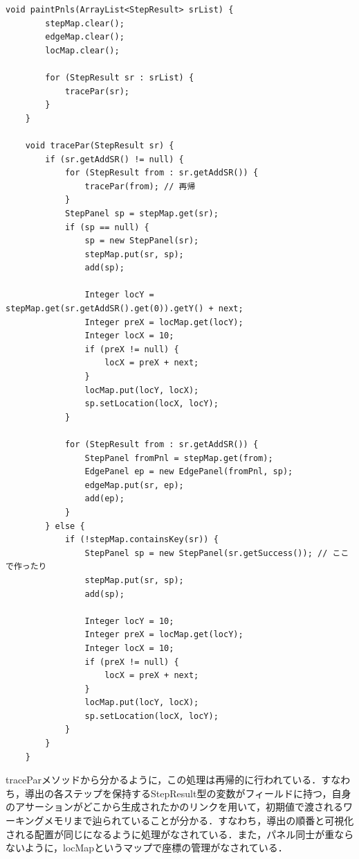 \documentclass[12pt]{jarticle}
\begin{document}
\begin{lstlisting}[caption=FwdChainGUIクラスのメソッドpaintPnls，tracePar, label=steplocation]
    void paintPnls(ArrayList<StepResult> srList) {
        stepMap.clear();
        edgeMap.clear();
        locMap.clear();

        for (StepResult sr : srList) {
            tracePar(sr);
        }
    }

    void tracePar(StepResult sr) {
        if (sr.getAddSR() != null) {
            for (StepResult from : sr.getAddSR()) {
                tracePar(from); // 再帰
            }
            StepPanel sp = stepMap.get(sr);
            if (sp == null) {
                sp = new StepPanel(sr);
                stepMap.put(sr, sp);
                add(sp);

                Integer locY = stepMap.get(sr.getAddSR().get(0)).getY() + next;
                Integer preX = locMap.get(locY);
                Integer locX = 10;
                if (preX != null) {
                    locX = preX + next;
                }
                locMap.put(locY, locX);
                sp.setLocation(locX, locY);
            }

            for (StepResult from : sr.getAddSR()) {
                StepPanel fromPnl = stepMap.get(from);
                EdgePanel ep = new EdgePanel(fromPnl, sp);
                edgeMap.put(sr, ep);
                add(ep);
            }
        } else {
            if (!stepMap.containsKey(sr)) {
                StepPanel sp = new StepPanel(sr.getSuccess()); // ここで作ったり
                stepMap.put(sr, sp);
                add(sp);

                Integer locY = 10;
                Integer preX = locMap.get(locY);
                Integer locX = 10;
                if (preX != null) {
                    locX = preX + next;
                }
                locMap.put(locY, locX);
                sp.setLocation(locX, locY);
            }
        }
    }

\end{lstlisting}

traceParメソッドから分かるように，この処理は再帰的に行われている．すなわち，導出の各ステップを保持するStepResult型の変数がフィールドに持つ，自身のアサーションがどこから生成されたかのリンクを用いて，初期値で渡されるワーキングメモリまで辿られていることが分かる．すなわち，導出の順番と可視化される配置が同じになるように処理がなされている．また，パネル同士が重ならないように，locMapというマップで座標の管理がなされている．
\end{document}
